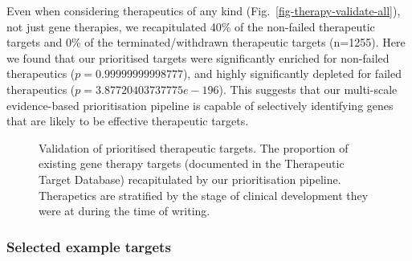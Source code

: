 \documentclass[
]{article}
\begin{document}
Even when considering therapeutics of any kind
(Fig.~\ref{fig-therapy-validate-all}), not just gene therapies, we
recapitulated 40\% of the non-failed therapeutic targets and 0\% of the
terminated/withdrawn therapeutic targets (n=1255). Here we found that
our prioritised targets were significantly enriched for non-failed
therapeutics (\(p=0.99999999998777\)), and highly significantly depleted
for failed therapeutics (\(p=3.87720403737775e-196\)). This suggests
that our multi-scale evidence-based prioritisation pipeline is capable
of selectively identifying genes that are likely to be effective
therapeutic targets.

\label{cell-fig-therapy-validate}
\begin{figure}[H]


\caption{\label{fig-therapy-validate}Validation of prioritised
therapeutic targets. The proportion of existing gene therapy targets
(documented in the Therapeutic Target Database) recapitulated by our
prioritisation pipeline. Therapetics are stratified by the stage of
clinical development they were at during the time of writing.}

\end{figure}%

\subsubsection{Selected example targets}\label{selected-example-targets}
\end{document}
